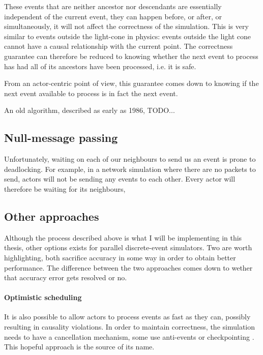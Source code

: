 These events that are neither ancestor nor descendants are essentially independent of the current event, they can happen before, or after, or simultaneously, it will not affect the correctness of the simulation.
This is very similar to events outside the light-cone in physics: events outside the light cone cannot have a causal relationship with the current point.
The correctness guarantee can therefore be reduced to knowing whether the next event to process has had all of its ancestors have been processed, i.e. it is safe.

From an actor-centric point of view, this guarantee comes down to knowing if the next event available to process is in fact the next event.

An old algorithm, described as early as 1986\cite{misra_distributed_1986}, TODO...

\subsection{Null-message passing} \label{null-messages}

Unfortunately, waiting on each of our neighbours to send us an event is prone to deadlocking.
For example, in a network simulation where there are no packets to send, actors will not be sending any events to each other.
Every actor will therefore be waiting for its neighbours, 

\subsection{Other approaches}

Although the process described above is what I will be implementing in this thesis, other options exists for parallel discrete-event simulators.
Two are worth highlighting, both sacrifice accuracy in some way in order to obtain better performance.
The difference between the two approaches comes down to wether that accuracy error gets resolved or no.

\paragraph{Optimistic scheduling} \label{optimistic-scheduling}
It is also possible to allow actors to process events as fast as they can, possibly resulting in causality violations.
In order to maintain correctness, the simulation needs to have a cancellation mechanism, some use anti-events \cite{} or checkpointing \cite{}. %
This hopeful approach is the source of its name.

